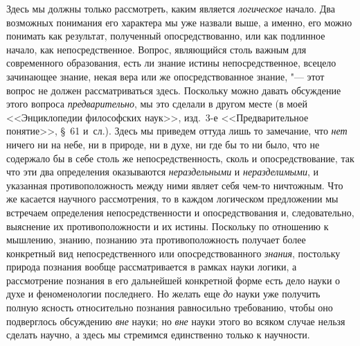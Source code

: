 Здесь мы должны только рассмотреть, каким является
{\em логическое} начало. Два возможных понимания его
характера мы уже назвали выше, а именно, его можно понимать как результат,
полученный опосредствованно, или как подлинное начало, как
непосредственное. Вопрос, являющийся столь важным для современного
образования, есть ли знание истины непосредственное, всецело зачинающее
знание, некая вера или же опосредствованное знание, "--- этот вопрос не должен
рассматриваться здесь. Поскольку можно давать обсуждение этого вопроса
{\em предварительно}, мы это сделали в другом месте (в
моей <<Энциклопедии философских наук>>, изд.~3-е <<Предварительное понятие>>,
\S~61 и~сл.). Здесь мы приведем оттуда лишь то замечание, что
{\em нет} ничего ни на небе, ни в природе, ни в духе,
ни где бы то ни было, что не содержало бы в себе столь же
непосредственность, сколь и опосредствование, так что эти два определения
оказываются {\em нераздельными} и
{\em неразделимыми}, и указанная противоположность
между ними являет себя чем-то ничтожным. Что же касается научного
рассмотрения, то в каждом логическом предложении мы встречаем определения
непосредственности и опосредствования и, следовательно, выяснение их
противоположности и их истины. Поскольку по отношению к мышлению, знанию,
познанию эта противоположность получает более конкретный вид
непосредственного или опосредствованного {\em знания},
постольку природа познания вообще рассматривается в рамках науки логики, а
рассмотрение познания в его дальнейшей конкретной форме есть дело науки о
духе и феноменологии последнего. Но желать еще {\em до}
науки уже получить полную ясность относительно познания равносильно
требованию, чтобы оно подверглось обсуждению {\em вне}
науки; но {\em вне} науки этого во всяком случае нельзя
сделать научно, а здесь мы стремимся единственно только к научности.

